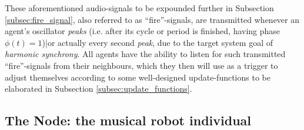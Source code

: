 	These aforementioned audio-signals to be expounded further in Subsection \ref{subsec:fire_signal}, also referred to as ``fire''-signals, are transmitted whenever an agent's oscillator \textit{peaks} (i.e. after its cycle or period is finished, having phase $\phi(t)=1$)|or actually every second \textit{peak}, due to the target system goal of \textit{harmonic synchrony}. All agents have the ability to listen for such transmitted ``fire''-signals from their neighbours, which they then will use as a trigger to adjust themselves according to some well-designed update-functions to be elaborated in Subsection \ref{subsec:update_functions}.




	
	\subsection{The Node: the musical robot individual}
	\label{subsec:node}


